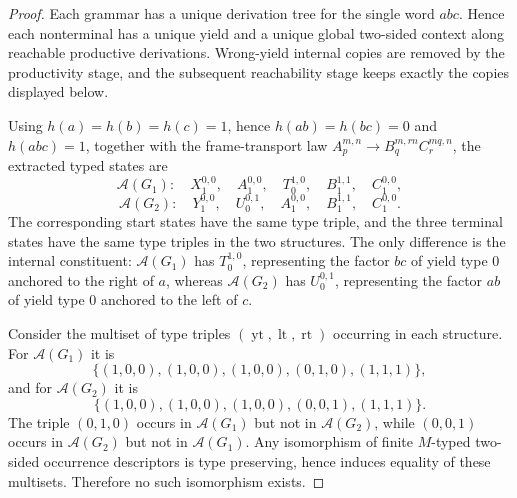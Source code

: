 \documentclass[sub]{jalc}
\newcommand{\yt}{\operatorname{yt}}
\newcommand{\lt}{\operatorname{lt}}
\newcommand{\rt}{\operatorname{rt}}
\begin{document}
\begin{proof}
Each grammar has a unique derivation tree for the single word \(abc\). Hence each nonterminal has a unique yield and a unique global two-sided context along reachable productive derivations. Wrong-yield internal copies are removed by the productivity stage, and the subsequent reachability stage keeps exactly the copies displayed below.

Using \(h(a)=h(b)=h(c)=1\), hence \(h(ab)=h(bc)=0\) and \(h(abc)=1\), together with the frame-transport law \(A_p^{m,n}\to B_q^{m,rn}C_r^{mq,n}\), the extracted typed states are
\[
  \mathcal A(G_1):\quad
  X_1^{0,0},\quad A_1^{0,0},\quad T_0^{1,0},\quad B_1^{1,1},\quad C_1^{0,0},
\]
\[
  \mathcal A(G_2):\quad
  Y_1^{0,0},\quad U_0^{0,1},\quad A_1^{0,0},\quad B_1^{1,1},\quad C_1^{0,0}.
\]
The corresponding start states have the same type triple, and the three terminal states have the same type triples in the two structures. The only difference is the internal constituent: \(\mathcal A(G_1)\) has \(T_0^{1,0}\), representing the factor \(bc\) of yield type \(0\) anchored to the right of \(a\), whereas \(\mathcal A(G_2)\) has \(U_0^{0,1}\), representing the factor \(ab\) of yield type \(0\) anchored to the left of \(c\).

Consider the multiset of type triples \((\yt,\lt,\rt)\) occurring in each structure. For \(\mathcal A(G_1)\) it is
\[
\{(1,0,0),(1,0,0),(1,0,0),(0,1,0),(1,1,1)\},
\]
and for \(\mathcal A(G_2)\) it is
\[
\{(1,0,0),(1,0,0),(1,0,0),(0,0,1),(1,1,1)\}.
\]
The triple \((0,1,0)\) occurs in \(\mathcal A(G_1)\) but not in \(\mathcal A(G_2)\), while \((0,0,1)\) occurs in \(\mathcal A(G_2)\) but not in \(\mathcal A(G_1)\). Any isomorphism of finite \(M\)-typed two-sided occurrence descriptors is type preserving, hence induces equality of these multisets. Therefore no such isomorphism exists.
\end{proof}
\end{document}
